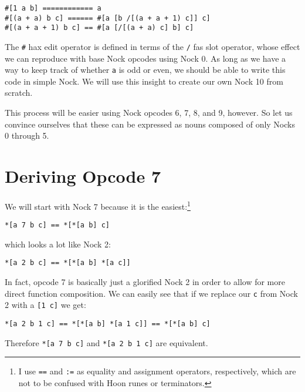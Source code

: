 \documentclass[twoside]{article}
\begin{document}
\begin{lstlisting}[style=listingblock]
#[1 a b] ============ a
#[(a + a) b c] ====== #[a [b /[(a + a + 1) c]] c]
#[(a + a + 1) b c] == #[a [/[(a + a) c] b] c]
\end{lstlisting}

\noindent
The \lstinline[style=inlinecode]{#} hax edit operator is defined in terms of the \lstinline[style=inlinecode]{/} fas slot operator, whose effect we can reproduce with base Nock opcodes using Nock 0.  As long as we have a way to keep track of whether \lstinline[style=inlinecode]{a} is odd or even, we should be able to write this code in simple Nock. We will use this insight to create our own Nock 10 from scratch.

This process will be easier using Nock opcodes 6, 7, 8, and 9, however.  So let us convince ourselves that these can be expressed as nouns composed of only Nocks 0 through 5.

\section{Deriving Opcode 7}

We  will start with Nock 7 because it is the easiest:\footnote{I use \texttt{==} and \texttt{:=} as equality and assignment operators, respectively, which are not to be confused with Hoon runes or terminators.}

\begin{lstlisting}[style=listingblock]
*[a 7 b c] == *[*[a b] c]
\end{lstlisting}

\noindent
which looks a lot like Nock 2:

\begin{lstlisting}[style=listingblock]
*[a 2 b c] == *[*[a b] *[a c]]
\end{lstlisting}

In fact, opcode 7 is basically just a glorified Nock 2 in order to allow for more direct function composition.  We can easily see that if we replace our \lstinline[style=inlinecode]{c} from Nock 2 with a \lstinline[style=inlinecode]{[1 c]} we get:

\begin{lstlisting}[style=listingblock]
*[a 2 b 1 c] == *[*[a b] *[a 1 c]] == *[*[a b] c]
\end{lstlisting}

\noindent
Therefore \lstinline[style=inlinecode]{*[a 7 b c]} and \lstinline[style=inlinecode]{*[a 2 b 1 c]} are equivalent.
\end{document}
